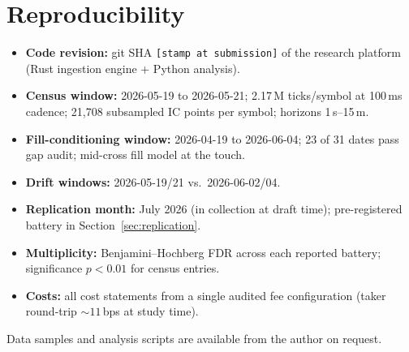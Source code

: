 \documentclass[11pt,a4paper]{article}
\theoremstyle{definition}
\theoremstyle{plain}
\begin{document}
\appendix
\section{Reproducibility}\label{app:repro}

\begin{itemize}
\item \textbf{Code revision:} git SHA \texttt{[stamp at submission]}
of the research platform (Rust ingestion engine + Python analysis).
\item \textbf{Census window:} 2026-05-19 to 2026-05-21;
2.17\,M ticks/symbol at 100\,ms cadence; 21{,}708 subsampled IC
points per symbol; horizons 1\,s--15\,m.
\item \textbf{Fill-conditioning window:} 2026-04-19 to 2026-06-04;
23 of 31 dates pass gap audit; mid-cross fill model at the touch.
\item \textbf{Drift windows:} 2026-05-19/21 vs.\ 2026-06-02/04.
\item \textbf{Replication month:} July 2026 (in collection at draft
time); pre-registered battery in Section~\ref{sec:replication}.
\item \textbf{Multiplicity:} Benjamini--Hochberg FDR across each
reported battery; significance $p<0.01$ for census entries.
\item \textbf{Costs:} all cost statements from a single audited fee
configuration (taker round-trip ${\sim}11$\,bps at study time).
\end{itemize}

Data samples and analysis scripts are available from the author on
request.
\end{document}
